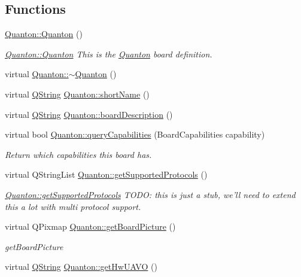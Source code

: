 \subsection*{Functions}
\begin{DoxyCompactItemize}
\item 
\hyperlink{group___boards___quantec_ga39ce601b1744d463fc4a56681c46135f}{Quanton\-::\-Quanton} ()
\begin{DoxyCompactList}\small\item\em \hyperlink{group___boards___quantec_ga39ce601b1744d463fc4a56681c46135f}{Quanton\-::\-Quanton} This is the \hyperlink{class_quanton}{Quanton} board definition. \end{DoxyCompactList}\item 
virtual \hyperlink{group___boards___quantec_ga8fdeca3eefac72603d963569a4ef7a5d}{Quanton\-::$\sim$\-Quanton} ()
\item 
virtual \hyperlink{group___u_a_v_objects_plugin_gab9d252f49c333c94a72f97ce3105a32d}{Q\-String} \hyperlink{group___boards___quantec_gab687582af9051f5955c3c797244dcb64}{Quanton\-::short\-Name} ()
\item 
virtual \hyperlink{group___u_a_v_objects_plugin_gab9d252f49c333c94a72f97ce3105a32d}{Q\-String} \hyperlink{group___boards___quantec_gae3241fa8f27da1d6e9e01e92be744d71}{Quanton\-::board\-Description} ()
\item 
virtual bool \hyperlink{group___boards___quantec_gafceea1eeec5e241c7526b8217b6d9ff9}{Quanton\-::query\-Capabilities} (Board\-Capabilities capability)
\begin{DoxyCompactList}\small\item\em Return which capabilities this board has. \end{DoxyCompactList}\item 
virtual Q\-String\-List \hyperlink{group___boards___quantec_ga8e7000bd17a41b004dbb8e9639387eb1}{Quanton\-::get\-Supported\-Protocols} ()
\begin{DoxyCompactList}\small\item\em \hyperlink{group___boards___quantec_ga8e7000bd17a41b004dbb8e9639387eb1}{Quanton\-::get\-Supported\-Protocols} T\-O\-D\-O\-: this is just a stub, we'll need to extend this a lot with multi protocol support. \end{DoxyCompactList}\item 
virtual Q\-Pixmap \hyperlink{group___boards___quantec_gabf4519ffd0e2aaa2c692d9ec58b3bfd1}{Quanton\-::get\-Board\-Picture} ()
\begin{DoxyCompactList}\small\item\em get\-Board\-Picture \end{DoxyCompactList}\item 
virtual \hyperlink{group___u_a_v_objects_plugin_gab9d252f49c333c94a72f97ce3105a32d}{Q\-String} \hyperlink{group___boards___quantec_gaf97ebd024db824870ba29203fd6d0bb6}{Quanton\-::get\-Hw\-U\-A\-V\-O} ()
\end{DoxyCompactItemize}


